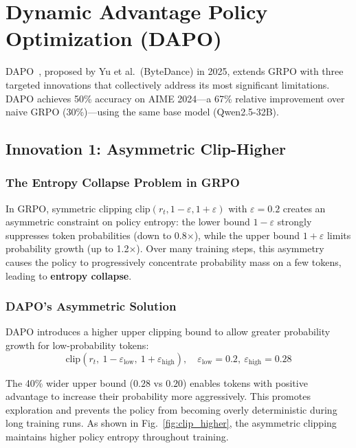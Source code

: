 \section{Dynamic Advantage Policy Optimization (DAPO)}
\label{sec:dapo}

DAPO~\cite{yu2025dapo}, proposed by Yu et al.\ (ByteDance) in 2025, extends GRPO with three targeted innovations that collectively address its most significant limitations. DAPO achieves 50\% accuracy on AIME 2024---a 67\% relative improvement over naive GRPO (30\%)---using the same base model (Qwen2.5-32B).

\subsection{Innovation 1: Asymmetric Clip-Higher}

\subsubsection{The Entropy Collapse Problem in GRPO}

In GRPO, symmetric clipping $\text{clip}(r_t, 1{-}\varepsilon, 1{+}\varepsilon)$ with $\varepsilon = 0.2$ creates an asymmetric constraint on policy entropy: the lower bound $1 - \varepsilon$ strongly suppresses token probabilities (down to 0.8$\times$), while the upper bound $1 + \varepsilon$ limits probability growth (up to 1.2$\times$). Over many training steps, this asymmetry causes the policy to progressively concentrate probability mass on a few tokens, leading to \textbf{entropy collapse}.

\subsubsection{DAPO's Asymmetric Solution}

DAPO introduces a higher upper clipping bound to allow greater probability growth for low-probability tokens:
\begin{equation}
\text{clip}(r_t,\ 1{-}\varepsilon_{\text{low}},\ 1{+}\varepsilon_{\text{high}}), \quad \varepsilon_{\text{low}}=0.2,\ \varepsilon_{\text{high}}=0.28
\label{eq:clip_higher}
\end{equation}

The 40\% wider upper bound ($0.28$ vs $0.20$) enables tokens with positive advantage to increase their probability more aggressively. This promotes exploration and prevents the policy from becoming overly deterministic during long training runs. As shown in Fig.~\ref{fig:clip_higher}, the asymmetric clipping maintains higher policy entropy throughout training.

